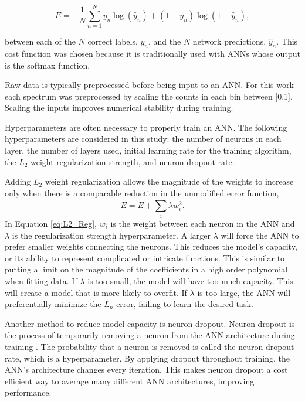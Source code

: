 \documentclass[tocnosub,noragright,centerchapter,12pt,fullpage]{uiucecethesis09}
\begin{document}
\begin{equation} \label{eq:CrossEntropy}
E = -{\frac{1} N} \sum_{n=1}^N y_n \log(\hat{y}_n) +  (1-y_n) \log(1-\hat{y}_n),
\end{equation}

between each of the $N$ correct labels, $y_n$, and the $N$ network predictions, $\hat{y}_n$. This cost function was chosen because it is traditionally used with ANNs whose output is the softmax function. 

Raw data is typically preprocessed before being input to an ANN. For this work each spectrum was preprocessed by scaling the counts in each bin between [0,1]. Scaling the inputs improves numerical stability during training. 

Hyperparameters are often necessary to properly train an ANN. The following hyperparameters are considered in this study: the number of neurons in each layer, the number of layers used, initial learning rate for the training algorithm, the $L_2$ weight regularization strength, and neuron dropout rate. 

Adding $L_2$ weight regularization allows the magnitude of the weights to increase only when there is a comparable reduction in the unmodified error function,
%
\begin{equation} \label{eq:L2_Reg}
\tilde{E} = E + \sum_i \lambda w_i^2.
\end{equation}
%
In Equation \ref{eq:L2_Reg}, $w_i$ is the weight between each neuron in the ANN and $\lambda$ is the regularization strength hyperparameter. A larger $\lambda$ will force the ANN to prefer smaller weights connecting the neurons. This reduces the model's capacity, or its ability to represent complicated or intricate functions. This is similar to putting a limit on the magnitude of the coefficients in a high order polynomial when fitting data. If $\lambda$ is too small, the model will have too much capacity. This will create a model that is more likely to overfit. If $\lambda$ is too large, the ANN will preferentially minimize the $L_n$ error, failing to learn the desired task.

Another method to reduce model capacity is neuron dropout. Neuron dropout is the process of temporarily removing a neuron from the ANN architecture during training \cite{Srivastava2014}. The probability that a neuron is removed is called the neuron dropout rate, which is a hyperparameter. By applying dropout throughout training, the ANN's architecture changes every iteration. This makes neuron dropout a cost efficient way to average many different ANN architectures, improving performance.
\end{document}
